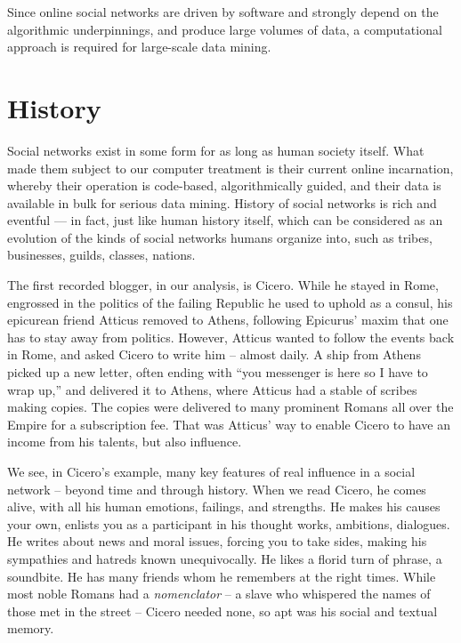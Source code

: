 \documentclass[10pt,oneside]{memoir}
\begin{document}
Since online social networks are driven by software and strongly depend on the algorithmic underpinnings, and produce large volumes of data, a computational approach is required for large-scale data mining.


\pagebreak \section{History}
\label{history}

Social networks exist in some form for as long as human society itself.  What made them subject to our computer treatment is their current online incarnation, whereby their operation is code-based, algorithmically guided, and their data is available in bulk for serious data mining.
History of social networks is rich and eventful --- in fact, just like human history itself, which can be considered as an evolution of the kinds of social networks humans organize into, such as tribes, businesses, guilds, classes, nations.


The first recorded blogger, in our analysis, is Cicero.  While he stayed in Rome, engrossed in the politics of the failing Republic he used to uphold as a consul, his epicurean friend Atticus removed to Athens, following Epicurus' maxim that one has to stay away from politics.  However, Atticus wanted to follow the events back in Rome, and asked Cicero to write him -- almost daily.  A ship from Athens picked up a new letter, often ending with ``you messenger is here so I have to wrap up,'' and delivered it to Athens, where Atticus had a stable of scribes making copies.  The copies were delivered to many prominent Romans all over the Empire for a subscription fee.  That was Atticus' way to enable Cicero to have an income from his talents, but also influence.


We see, in Cicero's example, many key features of real influence in a social network -- beyond time and through history.  When we read Cicero, he comes alive, with all his human emotions, failings, and strengths.  He makes his causes your own, enlists you as a participant in his thought works, ambitions, dialogues.  He writes about news and moral issues, forcing you to take sides, making his sympathies and hatreds known unequivocally.  He likes a florid turn of phrase, a soundbite.  He has many friends whom he remembers at the right times.  While most noble Romans had a {\itshape nomenclator} -- a slave who whispered the names of those met in the street -- Cicero needed none, so apt was his social and textual memory.
\end{document}
